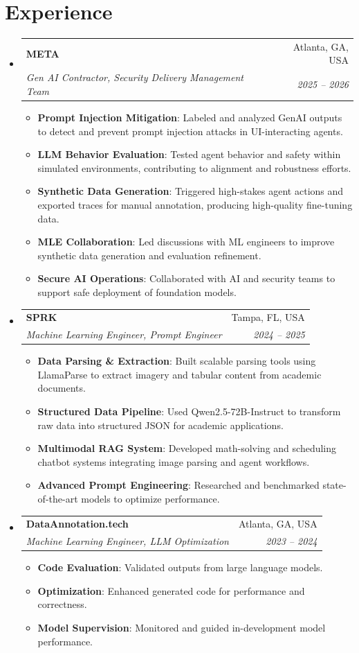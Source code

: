 \documentclass[letterpaper,11pt]{article}
\makeatletter
\newcommand{\resumeItem}[2]{
  \item\small{
    \textbf{#1}{: #2 \vspace{-2pt}}
  }
}
\newcommand{\resumeSubheading}[4]{
  \vspace{-1pt}\item
    \begin{tabular*}{0.97\textwidth}{l@{\extracolsep{\fill}}r}
      \textbf{#1} & #2 \\
      \textit{\small#3} & \textit{\small #4} \\
    \end{tabular*}\vspace{-5pt}
}
\newcommand{\resumeSubHeadingListStart}{\begin{itemize}[leftmargin=*, itemsep=0pt]}
\newcommand{\resumeSubHeadingListEnd}{\end{itemize}}
\newcommand{\resumeItemListStart}{\begin{itemize}[itemsep=0pt]}
\newcommand{\resumeItemListEnd}{\end{itemize}\vspace{-5pt}}
\makeatother
\begin{document}
\vspace{-0.5cm}

\section{Experience}
\resumeSubHeadingListStart

  \resumeSubheading
  {META}{Atlanta, GA, USA}
  {Gen AI Contractor, Security Delivery Management Team}{2025 – 2026}
  \resumeItemListStart
    \resumeItem{Prompt Injection Mitigation}{Labeled and analyzed GenAI outputs to detect and prevent prompt injection attacks in UI-interacting agents.}
    \resumeItem{LLM Behavior Evaluation}{Tested agent behavior and safety within simulated environments, contributing to alignment and robustness efforts.}
    \resumeItem{Synthetic Data Generation}{Triggered high-stakes agent actions and exported traces for manual annotation, producing high-quality fine-tuning data.}
    \resumeItem{MLE Collaboration}{Led discussions with ML engineers to improve synthetic data generation and evaluation refinement.}
    \resumeItem{Secure AI Operations}{Collaborated with AI and security teams to support safe deployment of foundation models.}
  \resumeItemListEnd

  \resumeSubheading
  {SPRK}{Tampa, FL, USA}
  {Machine Learning Engineer, Prompt Engineer}{2024 – 2025}
  \resumeItemListStart
    \resumeItem{Data Parsing \& Extraction}{Built scalable parsing tools using LlamaParse to extract imagery and tabular content from academic documents.}
    \resumeItem{Structured Data Pipeline}{Used Qwen2.5-72B-Instruct to transform raw data into structured JSON for academic applications.}
    \resumeItem{Multimodal RAG System}{Developed math-solving and scheduling chatbot systems integrating image parsing and agent workflows.}
    \resumeItem{Advanced Prompt Engineering}{Researched and benchmarked state-of-the-art models to optimize performance.}
  \resumeItemListEnd

  \resumeSubheading
  {DataAnnotation.tech}{Atlanta, GA, USA}
  {Machine Learning Engineer, LLM Optimization}{2023 – 2024}
  \resumeItemListStart
    \resumeItem{Code Evaluation}{Validated outputs from large language models.}
    \resumeItem{Optimization}{Enhanced generated code for performance and correctness.}
    \resumeItem{Model Supervision}{Monitored and guided in-development model performance.}
  \resumeItemListEnd

\resumeSubHeadingListEnd
\end{document}
